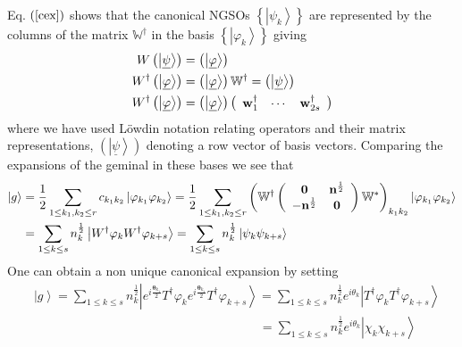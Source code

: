\documentclass[aps,preprint]{revtex4}%
\begin{document}
Eq. $\left(  \ref{cex}\right)  $ shows that the canonical NGSOs $\left\{
\left\vert \psi_{k}\right\rangle \right\}  $ are represented by the columns of
the matrix $\mathbb{W}^{\dagger}$ in the basis $\left\{  \left\vert
\varphi_{k}\right\rangle \right\}  $ giving
\begin{align}
W\left(  \left\vert \underline{\psi}\right\rangle \right)   &  =\left(
\left\vert \underline{\varphi}\right\rangle \right)  \nonumber\\
W^{\dagger}\left(  \left\vert \underline{\varphi}\right\rangle \right)   &
=\left(  \left\vert \underline{\varphi}\right\rangle \right)  \mathbb{W}%
^{\dagger}=\left(  \left\vert \underline{\psi}\right\rangle \right)
\nonumber\\
W^{\dagger}\left(  \left\vert \underline{\varphi}\right\rangle \right)   &
=\left(  \left\vert \underline{\varphi}\right\rangle \right)  \left(
\begin{array}
[c]{ccc}%
\mathbf{w}_{1}^{\dagger} & \cdots & \mathbf{w}_{2s}^{\dagger}%
\end{array}
\right)
\end{align}
where we have used L\"{o}wdin notation \cite{Lowdinbook} relating operators
and their matrix representations, $\left(  \left\vert \underline{\psi
}\right\rangle \right)  $ denoting a row vector of basis vectors. Comparing
the expansions of the geminal in these bases we see that
\begin{align}
\left\vert g\right\rangle  &  =\frac{1}{2}\sum_{1\leq k_{1},k_{2}\leq
r}c_{k_{1}k_{2}}\left\vert \varphi_{k_{1}}\varphi_{k_{2}}\right\rangle
=\frac{1}{2}\sum_{1\leq k_{1},k_{2}\leq r}\left(  \mathbb{W}^{\dagger}\left(
\begin{array}
[c]{cc}%
\mathbf{0} & \mathbf{n}^{\frac{1}{2}}\\
-\mathbf{n}^{\frac{1}{2}} & \mathbf{0}%
\end{array}
\right)  \mathbb{W}^{\ast}\right)  _{k_{1}k_{2}}\left\vert \varphi_{k_{1}%
}\varphi_{k_{2}}\right\rangle \nonumber\\
&  =\sum_{1\leq k\leq s}n_{k}^{\frac{1}{2}}\left\vert W^{\dagger}\varphi
_{k}W^{\dagger}\varphi_{k+s}\right\rangle =\sum_{1\leq k\leq s}n_{k}^{\frac
{1}{2}}\left\vert \psi_{k}\psi_{k+s}\right\rangle
\end{align}
One can obtain a non unique canonical expansion by setting
\begin{align}
&  \left\vert g\right\rangle =\sum_{1\leq k\leq s}n_{k}^{\frac{1}{2}%
}\left\vert e^{i\frac{\boldsymbol{\theta}_{k_{1}}}{2}}T^{\dagger}\varphi
_{k}e^{i\frac{\boldsymbol{\theta}_{k_{1}}}{2}}T^{\dagger}\varphi
_{k+s}\right\rangle =\sum_{1\leq k\leq s}n_{k}^{\frac{1}{2}}e^{i\theta_{k}%
}\left\vert T^{\dagger}\varphi_{k}T^{\dagger}\varphi_{k+s}\right\rangle
\nonumber\\
&  \left.  \qquad\qquad\qquad\qquad\qquad\qquad\qquad\qquad\qquad\right.
=\sum_{1\leq k\leq s}n_{k}^{\frac{1}{2}}e^{i\theta_{k}}\left\vert \chi_{k}%
\chi_{k+s}\right\rangle
\end{align}
\end{document}
